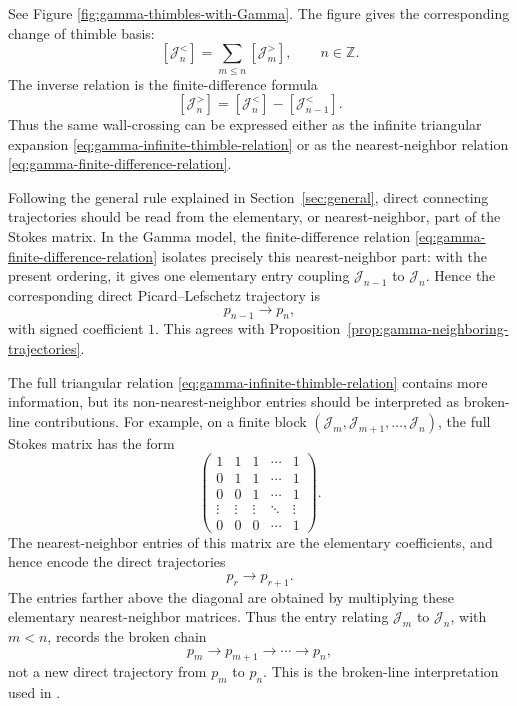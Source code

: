 \documentclass[11pt]{amsart}
\theoremstyle{plain}
\newcommand{\Z}{\mathbb Z}
\newcommand{\J}{\mathcal J}
\begin{document}
See Figure \ref{fig:gamma-thimbles-with-Gamma}.  The figure gives the corresponding change of thimble basis:
\begin{equation}\label{eq:gamma-infinite-thimble-relation}
[\J_n^{<}]
=
\sum_{m\le n}[\J_m^{>}],
\qquad n\in\Z.
\end{equation}
The inverse relation is the finite-difference formula
\begin{equation}\label{eq:gamma-finite-difference-relation}
[\J_n^{>}]
=
[\J_n^{<}]-[\J_{n-1}^{<}].
\end{equation}
Thus the same wall-crossing can be expressed either as the infinite triangular expansion
\eqref{eq:gamma-infinite-thimble-relation} or as the nearest-neighbor relation
\eqref{eq:gamma-finite-difference-relation}.

Following the general rule explained in Section~\ref{sec:general}, direct connecting
trajectories should be read from the elementary, or nearest-neighbor, part
of the Stokes matrix.  In the Gamma model, the finite-difference relation
\eqref{eq:gamma-finite-difference-relation} isolates precisely this
nearest-neighbor part: with the present ordering, it gives one elementary
entry coupling \(\J_{n-1}\) to \(\J_n\).  Hence the corresponding direct
Picard--Lefschetz trajectory is
\[
p_{n-1}\longrightarrow p_n,
\]
with signed coefficient \(1\).  This agrees with
Proposition~\ref{prop:gamma-neighboring-trajectories}.

The full triangular relation \eqref{eq:gamma-infinite-thimble-relation}
contains more information, but its non-nearest-neighbor entries should be
interpreted as broken-line contributions.  For example, on a finite block
\((\J_m,\J_{m+1},\ldots,\J_n)\), the full Stokes matrix has the form
\[
\begin{pmatrix}
1 & 1 & 1 & \cdots & 1\\
0 & 1 & 1 & \cdots & 1\\
0 & 0 & 1 & \cdots & 1\\
\vdots & \vdots & \vdots & \ddots & \vdots\\
0 & 0 & 0 & \cdots & 1
\end{pmatrix}.
\]
The nearest-neighbor entries of this matrix are the elementary coefficients, and hence
encode the direct trajectories
\[
p_r\longrightarrow p_{r+1}.
\]
The entries farther above the diagonal are obtained by multiplying these
elementary nearest-neighbor matrices.  Thus the entry relating \(\J_m\) to
\(\J_n\), with \(m<n\), records the broken chain
\[
p_m\longrightarrow p_{m+1}\longrightarrow\cdots\longrightarrow p_n,
\]
not a new direct trajectory from \(p_m\) to \(p_n\).  This is the
broken-line interpretation used in \cite[Appendix~C]{HarlowMaltzWitten2011}.
\end{document}
